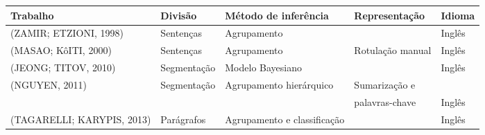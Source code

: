 \begin{table}[!h]
	\centering

	\begin{tabular}{lllll} \hline
		\textbf{Trabalho} & \textbf{Divisão} & \textbf{Método de inferência}  & \textbf{Representação} & \textbf{Idioma}\\
		\hline\hline

	
	 (ZAMIR; ETZIONI, 1998) &      	Sentenças  & Agrupamento                 & & Inglês \\ \hline
	 (MASAO; KôITI, 2000) &        	Sentenças  & Agrupamento                 & Rotulação manual & Inglês \\ \hline
	 (JEONG; TITOV, 2010) &        	Segmentação   & Modelo Bayesiano            & & Inglês \\ \hline
	 (NGUYEN, 2011) &              	Segmentação  & Agrupamento hierárquico     & Sumarização e \\ &&&palavras-chave& Inglês  \\ \hline
	 (TAGARELLI; KARYPIS, 2013) &  	Parágrafos & Agrupamento e classificação & & Inglês \\ \hline

	\end{tabular}

\end{table}







